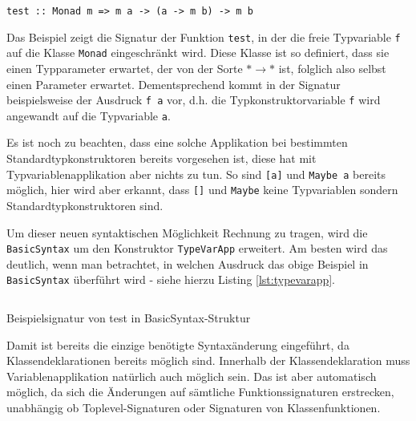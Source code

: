 \begin{verbatim}
test :: Monad m => m a -> (a -> m b) -> m b
\end{verbatim}

Das Beispiel zeigt die Signatur der Funktion \texttt{test}, in der die freie Typvariable \texttt{f} auf die Klasse \texttt{Monad}
eingeschränkt wird. Diese Klasse ist so definiert, dass sie einen Typparameter erwartet, der von der Sorte $* \rightarrow *$ ist,
folglich also selbst einen Parameter erwartet. Dementsprechend kommt in der Signatur beispielsweise der Ausdruck \texttt{f a} vor,
d.h. die Typkonstruktorvariable \texttt{f} wird angewandt auf die Typvariable \texttt{a}.

Es ist noch zu beachten, dass eine solche Applikation bei bestimmten Standardtypkonstruktoren bereits vorgesehen ist, diese
hat mit Typvariablenapplikation aber nichts zu tun. So sind \texttt{[a]} und \texttt{Maybe a} bereits möglich, hier wird aber
erkannt, dass \texttt{[]} und \texttt{Maybe} keine Typvariablen sondern Standardtypkonstruktoren sind. 

Um dieser neuen syntaktischen Möglichkeit Rechnung zu tragen, wird die \texttt{BasicSyntax} um den Konstruktor
\texttt{TypeVarApp} erweitert. Am besten wird das deutlich, wenn man betrachtet, in welchen Ausdruck das obige Beispiel
in \texttt{BasicSyntax} überführt wird - siehe hierzu Listing \ref{lst:typevarapp}.

\begin{listing}[ht]
\inputminted[tabsize=2]{haskell}{typevarapp.hs}
\caption{Beispielsignatur von test in BasicSyntax-Struktur}
\label{lst:typevarapp}
\end{listing}

Damit ist bereits die einzige benötigte Syntaxänderung eingeführt, da Klassendeklarationen bereits möglich sind. Innerhalb der
Klassendeklaration muss Variablenapplikation natürlich auch möglich sein. Das ist aber automatisch möglich, da sich die Änderungen
auf sämtliche Funktionssignaturen erstrecken, unabhängig ob Toplevel-Signaturen oder Signaturen von Klassenfunktionen.

